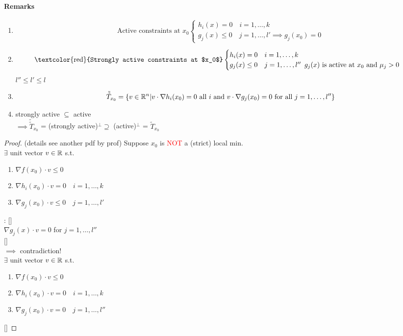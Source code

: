 \documentclass[11pt]{article}
\begin{document}
\paragraph{Remarks}
\begin{enumerate}
	\item $$\text{Active constraints at $x_0$} \begin{cases}
	h_i(x) = 0 \quad i=1,\hdots,k \\
	g_j(x) \leq 0 \quad j = 1,\hdots, l' \implies g_j(x_0) = 0
	\end{cases}$$

	\item $$\text{\textcolor{red}{Strongly active constraints at $x_0$}} 
	\begin{cases}
	h_i(x) = 0 \quad i=1,\hdots,k \\
	g_j(x) \leq 0 \quad j = 1,\hdots, l'' \,\,\, \text{$g_j(x)$ is active at $x_0 \text{ and } \mu_j > 0$}
	\end{cases}$$
	$l'' \leq l' \leq l$
	\item $$\tilde{\tilde{T}}_{x_0} = \{ v\in \mathbb{R}^n | v\cdot \nabla h_i(x_0) = 0 \text{ all $i$} \text{ and } v \cdot \nabla g_j(x_0) = 0 \text{ for all $j = 1, \hdots, l''$} \}$$
	\item strongly active $\subseteq$ active \\
	      $\implies \tilde{\tilde{T}}_{x_0}$ = (strongly active)$^\perp \supseteq$ (active)$^\perp$ = $\tilde{T}_{x_0}$
\end{enumerate}
\begin{proof}
	(details see another pdf by prof)
	Suppose $x_0$ is \textcolor{red}{NOT} a (strict) local min.\\
	 $\exists$ unit vector $v \in \mathbb{R}$ s.t.
	\begin{enumerate}
		\item $\nabla f(x_0) \cdot v \leq 0$
		\item $\nabla h_i(x_0) \cdot v = 0 \quad i = 1, \hdots, k$
		\item $\nabla g_j(x_0) \cdot v \leq 0 \quad j = 1, \hdots, l'$
	\end{enumerate}
	: [] \\
	 $\nabla g_j(x)\cdot v = 0$ for $j = 1, \hdots, l''$ \\
	 \\
	$\implies$ contradiction! \\
	 $\exists$ unit vector $v \in \mathbb{R}$ s.t.
	\begin{enumerate}
		\item $\nabla f(x_0) \cdot v \leq 0$
		\item $\nabla h_i(x_0) \cdot v = 0 \quad i = 1, \hdots, k$
		\item $\nabla g_j(x_0) \cdot v = 0 \quad j = 1, \hdots, l''$
	\end{enumerate}
\end{proof}
\end{document}
